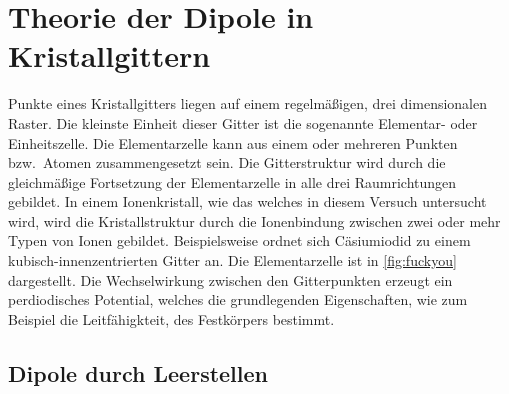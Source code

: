 \section{Theorie der Dipole in Kristallgittern}
\label{sec:theorie}

Punkte eines Kristallgitters liegen auf einem regelmäßigen, drei dimensionalen Raster.
Die kleinste Einheit dieser Gitter ist die sogenannte Elementar- oder Einheitszelle.
Die Elementarzelle kann aus einem oder mehreren Punkten bzw.\ Atomen zusammengesetzt sein.
Die Gitterstruktur wird durch die gleichmäßige Fortsetzung der Elementarzelle in alle drei Raumrichtungen gebildet.
In einem Ionenkristall, wie das welches in diesem Versuch untersucht wird,
wird die Kristallstruktur durch die Ionenbindung zwischen zwei oder mehr Typen von Ionen gebildet.
Beispielsweise ordnet sich Cäsiumiodid zu einem kubisch-innenzentrierten Gitter an.
Die Elementarzelle ist in \autoref{fig:fuckyou} dargestellt.
Die Wechselwirkung zwischen den Gitterpunkten erzeugt ein perdiodisches Potential,
welches die grundlegenden Eigenschaften,
wie zum Beispiel die Leitfähigkteit, des Festkörpers bestimmt.


\subsection{Dipole durch Leerstellen}

